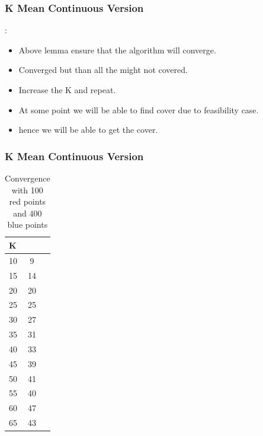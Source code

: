 \documentclass[blue]{beamer}
\begin{document}
\begin{frame}
 \frametitle{K Mean Continuous Version}
 {}: {\color{blue}{Algorithm will find cover.}}
 \begin{itemize}
  \item Above lemma ensure that the algorithm will converge.
  \item Converged but than all the {\color{red}{red point}} might not covered.
  \item Increase the K and repeat.
  \item At some point we will be able to find cover due to feasibility case.
  \item hence we will be able to get the cover.
 \end{itemize}
\end{frame}

\begin{frame}
 \frametitle{K Mean Continuous Version}
 
  {}
  \tiny
  \begin{table}[H]
  \centering
  \caption{Convergence with 100 red points and 400 blue points}
  \begin{tabular}{||l|c|c||} \hline
   K    & {\color{blue}{Actual Cluster size}} & {\color{blue}{Red Points Covered}}\\ \hline
   10   & 9                   & {\color{red}{34}}                 \\  \hline
   15   & 14                  & {\color{red}{57}}                  \\  \hline
   20   & 20                  & {\color{red}{81}}                  \\  \hline
   25   & 25                  & {\color{red}{85}}                  \\  \hline
   30   & 27                  & {\color{red}{87}}                  \\   \hline
   35   & 31                  & {\color{red}{92}}                  \\  \hline
   40   & 33                  & {\color{red}{93}}                  \\  \hline
   45   & 39                  & {\color{red}{97}}                   \\  \hline
   50   & 41                  & {\color{red}{99}}                   \\  \hline
   55   & 40                  & {\color{red}{98}}                   \\  \hline
   60   & 47                  & {\color{red}{99}}                   \\   \hline
   65   & 43                  & {\color{red}{100}}                    \\ \hline \hline
 \end{tabular}
 \end{table}
\end{frame}
\end{document}
